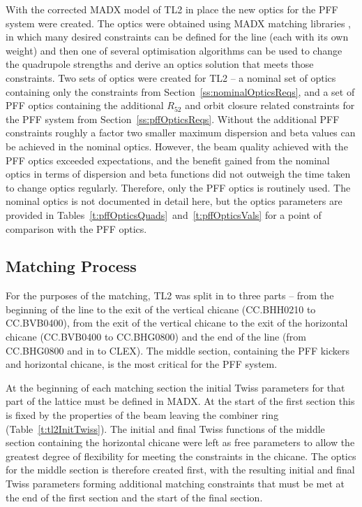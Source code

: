
With the corrected MADX model of TL2 in place the new optics for the PFF system were created. The optics were obtained using MADX matching libraries \cite{madx}, in which many desired constraints can be defined for the line (each with its own weight) and then one of several optimisation algorithms can be used to change the quadrupole strengths and derive an optics solution that meets those constraints. Two sets of optics were created for TL2 -- a nominal set of optics containing only the constraints from Section~\ref{ss:nominalOpticsReqs}, and a set of PFF optics containing the additional \(R_{52}\) and orbit closure related constraints for the PFF system from Section~\ref{ss:pffOpticsReqs}. Without the additional PFF constraints roughly a factor two smaller maximum dispersion and beta values can be achieved in the nominal optics. However, the beam quality achieved with the PFF optics exceeded expectations, and the benefit gained from the nominal optics in terms of dispersion and beta functions did not outweigh the time taken to change optics regularly. Therefore, only the PFF optics is routinely used. The nominal optics is not documented in detail here, but the optics parameters are provided in Tables~\ref{t:pffOpticsQuads}~and~\ref{t:pffOpticsVals} for a point of comparison with the PFF optics.

\subsection{Matching Process}
\label{ss:matchingMethod}

For the purposes of the matching, TL2 was split in to three parts -- from the beginning of the line to the exit of the vertical chicane (CC.BHH0210 to CC.BVB0400), from the exit of the vertical chicane to the exit of the horizontal chicane (CC.BVB0400 to CC.BHG0800) and the end of the line (from CC.BHG0800 and in to CLEX). The middle section, containing the PFF kickers and horizontal chicane, is the most critical for the PFF system.

At the beginning of each matching section the initial Twiss parameters for that part of the lattice must be defined in MADX. At the start of the first section this is fixed by the properties of the beam leaving the combiner ring (Table~\ref{t:tl2InitTwiss}). The initial and final Twiss functions of the middle section containing the horizontal chicane were left as free parameters to allow the greatest degree of flexibility for meeting the constraints in the chicane. The optics for the middle section is therefore created first, with the resulting initial and final Twiss parameters forming additional matching constraints that must be met at the end of the first section and the start of the final section.


